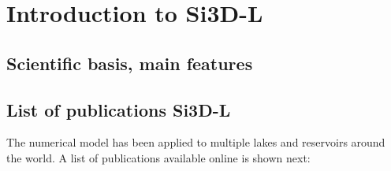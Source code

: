 \section{Introduction to Si3D-L}
\subsection{Scientific basis, main features}




\subsection{List of publications Si3D-L}

The numerical model has been applied to multiple lakes and reservoirs around the world. A list of publications available online is shown next:  

